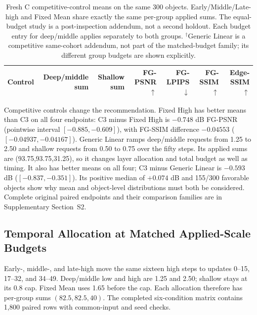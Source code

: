 \documentclass[times,twocolumn,final]{elsarticle}
\begin{document}
\begin{table}[t]
\centering\scriptsize\setlength{\tabcolsep}{4pt}
\caption{Fresh C competitive-control means on the same 300 objects. Early/Middle/Late-high and Fixed Mean share exactly the same per-group applied sums. The equal-budget study is a post-inspection addendum, not a second holdout. Each budget entry for deep/middle applies separately to both groups. $^\dagger$Generic Linear is a competitive same-cohort addendum, not part of the matched-budget family; its different group budgets are shown explicitly.}
\label{tab:freshc-absolute}\label{tab:matched-budget300}
\begin{tabular}{lrrrrrr}
\toprule Control & Deep/middle sum & Shallow sum & FG-PSNR$\uparrow$ & FG-LPIPS$\downarrow$ & FG-SSIM$\uparrow$ & Edge-SSIM$\uparrow$ \\
\midrule

\bottomrule
\end{tabular}
\end{table}

Competitive controls change the recommendation. Fixed High has better means than C3 on all four endpoints: C3 minus Fixed High is $-0.748$ dB FG-PSNR (pointwise interval $[-0.885,-0.609]$), with FG-SSIM difference $-0.04553$ ($[-0.04937,-0.04167]$). Generic Linear ramps deep/middle requests from 1.25 to 2.50 and shallow requests from 0.50 to 0.75 over the fifty steps. Its applied sums are (93.75,93.75,31.25), so it changes layer allocation and total budget as well as timing. It also has better means on all four; C3 minus Generic Linear is $-0.593$ dB ($[-0.837,-0.351]$). Its positive median of $+0.074$ dB and 155/300 favorable objects show why mean and object-level distributions must both be considered. Complete original paired endpoints and their comparison families are in Supplementary Section~S2.

\subsection{Temporal Allocation at Matched Applied-Scale Budgets}
\label{subsec:matched-budget300}
Early-, middle-, and late-high move the same sixteen high steps to updates 0--15, 17--32, and 34--49. Deep/middle low and high are 1.25 and 2.50; shallow stays at its 0.8 cap. Fixed Mean uses 1.65 before the cap. Each allocation therefore has per-group sums $(82.5,82.5,40)$. The completed six-condition matrix contains 1,800 paired rows with common-input and seed checks.
\end{document}
